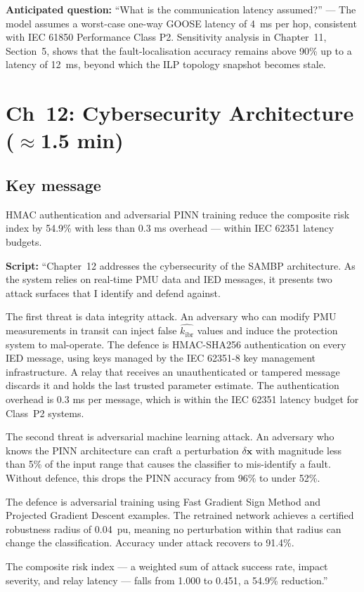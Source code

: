 \documentclass[11pt,a4paper]{article}
\newcommand{\script}[1]{\begin{scriptbox}\textbf{Script:} #1\end{scriptbox}}
\newcommand{\anticipate}[1]{\begin{warnbox}\textbf{Anticipated question:} #1\end{warnbox}}
\newcommand{\kibr}{k_{\mathrm{ibr}}}
\begin{document}
\anticipate{``What is the communication latency assumed?'' ---
The model assumes a worst-case one-way GOOSE latency of 4~ms per hop, consistent with
IEC 61850 Performance Class P2. Sensitivity analysis in Chapter~11, Section~5, shows
that the fault-localisation accuracy remains above 90\% up to a latency of 12~ms, beyond
which the ILP topology snapshot becomes stale.}

\section{Ch~12: Cybersecurity Architecture \hfill\normalfont\small($\approx$1.5 min)}
\label{slide:sec}

\subsection*{Key message}
HMAC authentication and adversarial PINN training reduce the composite risk index by
54.9\% with less than 0.3 ms overhead — within IEC 62351 latency budgets.

\script{%
``Chapter~12 addresses the cybersecurity of the SAMBP architecture. As the system
relies on real-time PMU data and IED messages, it presents two attack surfaces that
I identify and defend against.

The first threat is data integrity attack. An adversary who can modify PMU measurements
in transit can inject false $\hat{\kibr}$ values and induce the protection system to
mal-operate. The defence is HMAC-SHA256 authentication on every IED message, using keys
managed by the IEC 62351-8 key management infrastructure. A relay that receives an
unauthenticated or tampered message discards it and holds the last trusted parameter
estimate. The authentication overhead is 0.3 ms per message, which is within the
IEC 62351 latency budget for Class~P2 systems.

The second threat is adversarial machine learning attack. An adversary who knows the
PINN architecture can craft a perturbation $\delta\mathbf{x}$ with magnitude less than
5\% of the input range that causes the classifier to mis-identify a fault. Without
defence, this drops the PINN accuracy from 96\% to under 52\%.

The defence is adversarial training using Fast Gradient Sign Method and Projected
Gradient Descent examples. The retrained network achieves a certified robustness radius
of 0.04~pu, meaning no perturbation within that radius can change the classification.
Accuracy under attack recovers to 91.4\%.

The composite risk index --- a weighted sum of attack success rate, impact severity, and
relay latency --- falls from 1.000 to 0.451, a 54.9\% reduction.''%
}
\end{document}
